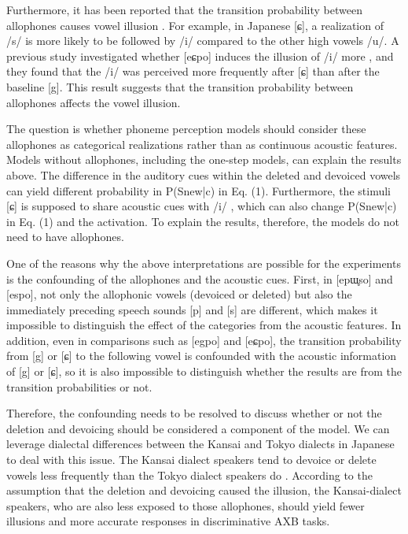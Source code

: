 \documentclass[a4paper,11pt,twocolumn]{article}
\begin{document}
Furthermore, it has been reported that the transition probability between allophones causes vowel illusion \cite{kilpatrick2020}. For example, in Japanese [ɕ], a realization of /s/ is more likely to be followed by /i/ compared to the other high vowels /u/. A previous study investigated whether [eɕpo] induces the illusion of /i/ more \cite{kilpatrick2020}, and they found that the /i/ was perceived more frequently after [ɕ] than after the baseline [g]. This result suggests that the transition probability between allophones affects the vowel illusion.

The question is whether phoneme perception models should consider these allophones as categorical realizations rather than as continuous acoustic features. Models without allophones, including the one-step models, can explain the results above. The difference in the auditory cues within the deleted and devoiced vowels can yield different probability in P(Snew|c) in Eq. (1). Furthermore, the stimuli [ɕ] is supposed to share acoustic cues with /i/ \cite{kubozono}, which can also change P(Snew|c) in Eq. (1) and the activation. To explain the results, therefore, the models do not need to have allophones.

One of the reasons why the above interpretations are possible for the experiments is the confounding of the allophones and the acoustic cues. First, in [epɯ̥so] and [espo], not only the allophonic vowels (devoiced or deleted) but also the immediately preceding speech sounds [p] and [s] are different, which makes it impossible to distinguish the effect of the categories from the acoustic features. In addition, even in comparisons such as [egpo] and [eɕpo], the transition probability from [g] or [ɕ] to the following vowel is confounded with the acoustic information of [g] or [ɕ], so it is also impossible to distinguish whether the results are from the transition probabilities or not.

Therefore, the confounding needs to be resolved to discuss whether or not the deletion and devoicing should be considered a component of the model. We can leverage dialectal differences between the Kansai and Tokyo dialects in Japanese \cite{kishiyama2022} to deal with this issue. The Kansai dialect speakers tend to devoice or delete vowels less frequently than the Tokyo dialect speakers do \cite{byen}. According to the assumption that the deletion and devoicing caused the illusion, the Kansai-dialect speakers, who are also less exposed to those allophones, should yield fewer illusions and more accurate responses in discriminative AXB tasks.
\end{document}
